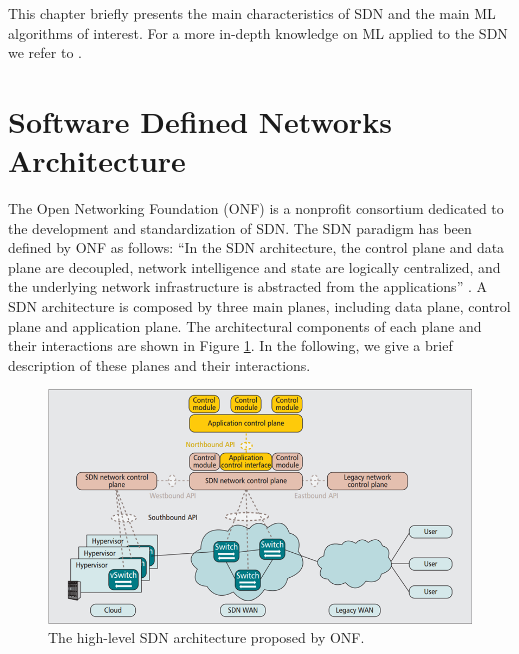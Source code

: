This chapter briefly presents the main characteristics of SDN and the main ML algorithms of interest. For a more in-depth knowledge on ML applied to the SDN we refer to \cite{Xie2019}.
\section{Software Defined Networks Architecture} \label{sec:SDN_BGK}
The Open Networking Foundation (ONF) \cite{ONF} is a nonprofit consortium dedicated to the development and standardization of SDN. The SDN paradigm has been defined by ONF as follows: “In the SDN architecture, the control plane and data plane are decoupled, network intelligence and state are logically centralized, and the underlying network infrastructure is abstracted from the applications” \cite{Sezer2013}.
A SDN architecture is composed by three main planes, including data plane, control plane and application plane. The architectural components of each plane and their interactions are shown in Figure \ref{fig:{ONF}}. In the following, we give a brief description of these planes and their interactions.
\begin{figure}[tb!]
	\centering
	\includegraphics[width=13cm]{figure/ONF.png}
	\caption{The high-level SDN architecture proposed by ONF.}
	\label{fig:{ONF}}
\end{figure}
